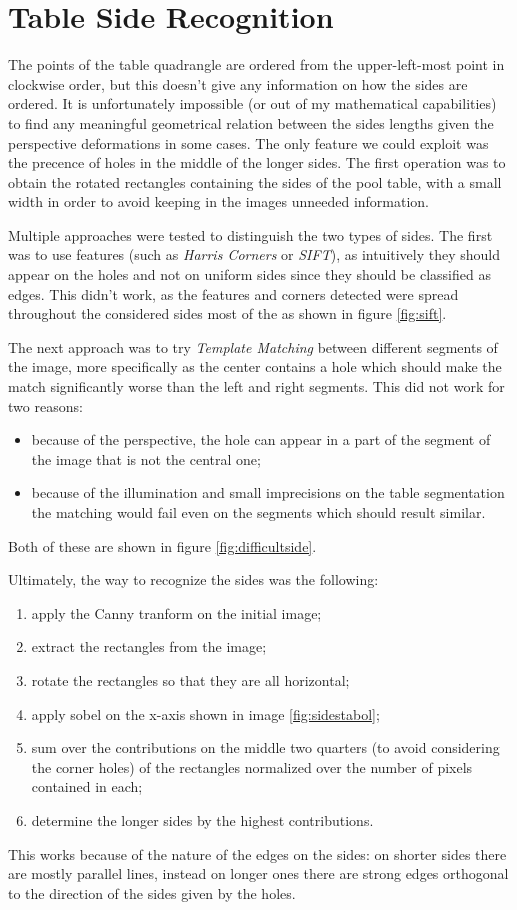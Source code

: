 \section{Table Side Recognition}

The points of the table quadrangle are ordered from the upper-left-most point in clockwise order, but this doesn't give
any information on how the sides are ordered. It is unfortunately impossible (or out of my
mathematical capabilities) to find any meaningful geometrical relation between the sides lengths
given the perspective deformations in some cases. The only feature we could exploit was the precence of
holes in the middle of the longer sides. The first operation was to obtain the rotated
rectangles containing the sides of the pool table, with a small width in order to avoid 
keeping in the images unneeded information.\par 
Multiple approaches were tested to distinguish the two types of sides. The first was 
to use features (such as \textit{Harris Corners} or \textit{SIFT}), as intuitively they should appear 
on the holes and not on uniform sides since they should be classified as edges. This didn't
work, as the features and corners detected were spread throughout the 
considered sides most of the as shown in figure \ref{fig:sift}.\par
The next approach was to try \textit{Template Matching} between different segments of the image, more specifically
as the center contains a hole which should make the match significantly worse than
the left and right segments. This did not work for two reasons:
\begin{itemize}
    \item because of the perspective, the hole can appear in a part of the segment of the image that is not the central one;
    \item because of the illumination and small imprecisions on the table segmentation the matching would fail even on the segments which should result similar.
\end{itemize}
Both of these are shown in figure \ref{fig:difficultside}.

\noindent
Ultimately, the way to recognize the sides was the following:
\begin{enumerate}
    \item apply the Canny tranform on the initial image;
    \item extract the rectangles from the image;
    \item rotate the rectangles so that they are all horizontal;
    \item apply sobel on the x-axis shown in image \ref{fig:sidestabol};
    \item sum over the contributions on the middle two quarters (to avoid considering the corner holes) of the rectangles normalized over the number of pixels contained in each;
    \item determine the longer sides by the highest contributions.
\end{enumerate}
This works because of the nature of the edges on the sides: on shorter sides there
are mostly parallel lines, instead on longer ones there are strong edges orthogonal to the direction of the sides given by the holes.

